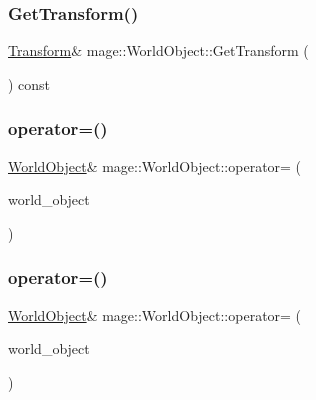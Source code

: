 \subsubsection{\texorpdfstring{Get\+Transform()}{GetTransform()}}
{\footnotesize\ttfamily \hyperlink{structmage_1_1_transform}{Transform}\& mage\+::\+World\+Object\+::\+Get\+Transform (\begin{DoxyParamCaption}{ }\end{DoxyParamCaption}) const}

\hypertarget{classmage_1_1_world_object_aa53dfc0e654aead5898d0cc76cbc9be6}{}\label{classmage_1_1_world_object_aa53dfc0e654aead5898d0cc76cbc9be6} 
\subsubsection{\texorpdfstring{operator=()}{operator=()}\hspace{0.1cm}{\footnotesize\ttfamily [1/2]}}
{\footnotesize\ttfamily \hyperlink{classmage_1_1_world_object}{World\+Object}\& mage\+::\+World\+Object\+::operator= (\begin{DoxyParamCaption}\item[{const \hyperlink{classmage_1_1_world_object}{World\+Object} \&}]{world\+\_\+object }\end{DoxyParamCaption})}

\hypertarget{classmage_1_1_world_object_a8dbb67991f149a2d4edbcd17ae4ec3ef}{}\label{classmage_1_1_world_object_a8dbb67991f149a2d4edbcd17ae4ec3ef} 
\subsubsection{\texorpdfstring{operator=()}{operator=()}\hspace{0.1cm}{\footnotesize\ttfamily [2/2]}}
{\footnotesize\ttfamily \hyperlink{classmage_1_1_world_object}{World\+Object}\& mage\+::\+World\+Object\+::operator= (\begin{DoxyParamCaption}\item[{\hyperlink{classmage_1_1_world_object}{World\+Object} \&\&}]{world\+\_\+object }\end{DoxyParamCaption})\hspace{0.3cm}{\ttfamily [default]}}

